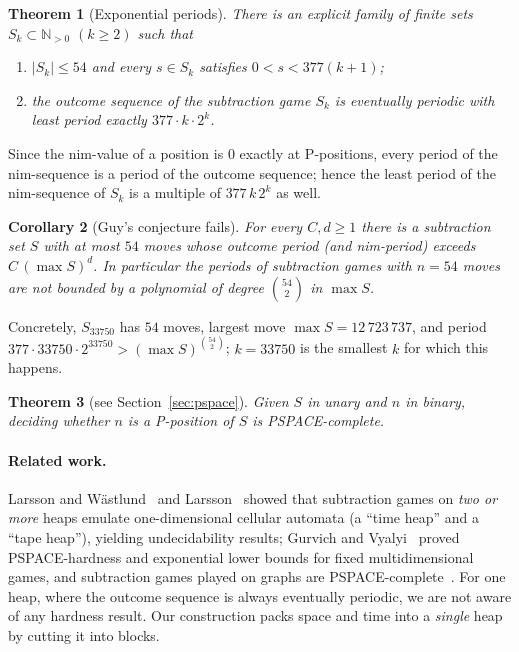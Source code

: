 \documentclass[11pt]{article}
\newtheorem{theorem}{Theorem}
\newtheorem{corollary}[theorem]{Corollary}
\theoremstyle{definition}
\newcommand{\N}{\mathbb{N}}
\begin{document}
\begin{theorem}[Exponential periods]\label{thm:main}
There is an explicit family of finite sets $S_k\subset\N_{>0}$ $(k\ge 2)$ such that
\begin{enumerate}[label=(\roman*)]
\item $|S_k|\le 54$ and every $s\in S_k$ satisfies $0<s<377(k+1)$;
\item the outcome sequence of the subtraction game $S_k$ is eventually periodic with least period
exactly $377\cdot k\cdot 2^{k}$.
\end{enumerate}
\end{theorem}

Since the nim-value of a position is $0$ exactly at P-positions, every period of the nim-sequence is
a period of the outcome sequence; hence the least period of the nim-sequence of $S_k$ is a
multiple of $377\,k\,2^k$ as well.

\begin{corollary}[Guy's conjecture fails]\label{cor:guy}
For every $C,d\ge 1$ there is a subtraction set $S$ with at most $54$ moves whose outcome period
(and nim-period) exceeds $C\,(\max S)^d$.  In particular the periods of subtraction games with
$n=54$ moves are not bounded by a polynomial of degree $\binom{54}{2}$ in $\max S$.
\end{corollary}

Concretely, $S_{33750}$ has $54$ moves, largest move $\max S=12\,723\,737$, and period
$377\cdot 33750\cdot 2^{33750}>(\max S)^{\binom{54}{2}}$; $k=33750$ is the smallest $k$ for which
this happens.

\begin{theorem}[see Section~\ref{sec:pspace}]
Given $S$ in unary and $n$ in binary, deciding whether $n$ is a P-position of $S$ is
PSPACE-complete.
\end{theorem}

\paragraph{Related work.}  Larsson and Wästlund~\cite{LW} and Larsson~\cite{L12} showed that
subtraction games on \emph{two or more} heaps emulate one-dimensional cellular automata (a ``time
heap'' and a ``tape heap''), yielding undecidability results; Gurvich and Vyalyi~\cite{GV} proved
PSPACE-hardness and exponential lower bounds for fixed multidimensional games, and subtraction games
played on graphs are PSPACE-complete~\cite{DGPS}.  For one heap, where
the outcome sequence is always eventually periodic, we are not aware of any hardness result.  Our construction
packs space and time into a \emph{single} heap by cutting it into blocks.
\end{document}

